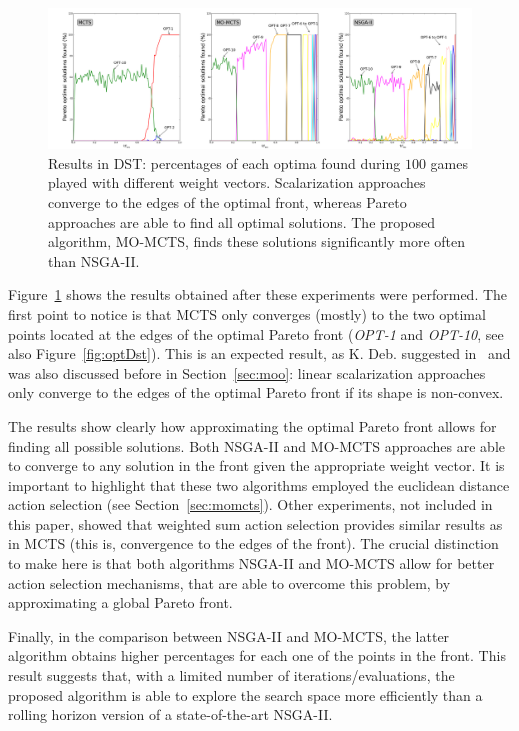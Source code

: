 \documentclass[journal]{IEEEtran}
\begin{document}
\begin{figure}[!t]
	\centering
	\includegraphics[width=2.1\columnwidth]{img/dstAll}
	\caption{Results in DST: percentages of each optima found during $100$ games played with different weight vectors. Scalarization approaches converge to the edges of the optimal front, whereas Pareto approaches are able to find all optimal solutions. The proposed algorithm, MO-MCTS, finds these solutions significantly more often than NSGA-II.}
	\label{fig:extCase}
\end{figure}

Figure~\ref{fig:extCase} shows the results obtained after these experiments were performed. The first point to notice is that MCTS only converges (mostly) to the two optimal points located at the edges of the optimal Pareto front (\textit{OPT-1} and \textit{OPT-10}, see also Figure~\ref{fig:optDst}). This is an expected result, as K. Deb. suggested in~\cite{Deb2001} and was also discussed before in Section~\ref{sec:moo}: linear scalarization approaches only converge to the edges of the optimal Pareto front if its shape is non-convex.

The results show clearly how approximating the optimal Pareto front allows for finding all possible solutions. Both NSGA-II and MO-MCTS approaches are able to converge to any solution in the front given the appropriate weight vector. It is important to highlight that these two algorithms employed the euclidean distance action selection (see Section~\ref{sec:momcts}). Other experiments, not included in this paper, showed that weighted sum action selection provides similar results as in MCTS (this is, convergence to the edges of the front). The crucial distinction to make here is that both algorithms NSGA-II and MO-MCTS allow for better action selection mechanisms, that are able to overcome this problem, by approximating a global Pareto front.

Finally, in the comparison between NSGA-II and MO-MCTS, the latter algorithm obtains higher percentages for each one of the points in the front. This result suggests that, with a limited number of iterations/evaluations, the proposed algorithm is able to explore the search space more efficiently than a rolling horizon version of a state-of-the-art NSGA-II.
\end{document}
